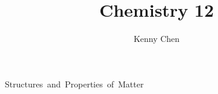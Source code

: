 \documentclass[12pt]{report}
\title{Chemistry 12}
\author{Kenny Chen}
\begin{document}
\maketitle
\tableofcontents
\newpage

\unit{Structures and Properties of Matter}



\end{document}

